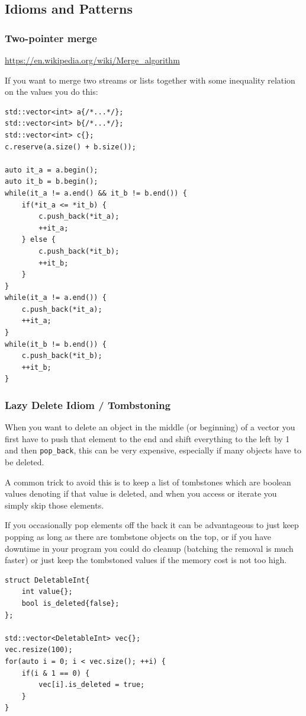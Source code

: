 \documentclass{article}
\begin{document}
\subsection{Idioms and Patterns}
\subsubsection{Two-pointer merge}
\url{https://en.wikipedia.org/wiki/Merge_algorithm}

If you want to merge two streams or lists together with some inequality relation on the values you do this:
\begin{lstlisting}
std::vector<int> a{/*...*/};
std::vector<int> b{/*...*/};
std::vector<int> c{};
c.reserve(a.size() + b.size());

auto it_a = a.begin();
auto it_b = b.begin();
while(it_a != a.end() && it_b != b.end()) {
    if(*it_a <= *it_b) {
        c.push_back(*it_a);
        ++it_a;
    } else {
        c.push_back(*it_b);
        ++it_b;
    }
}
while(it_a != a.end()) {
    c.push_back(*it_a);
    ++it_a;
}
while(it_b != b.end()) {
    c.push_back(*it_b);
    ++it_b;
}
\end{lstlisting}

\subsubsection{Lazy Delete Idiom / Tombstoning}
When you want to delete an object in the middle (or beginning) of a vector you first have to push that element to the end and shift everything to the left by 1 and then \texttt{pop\_back}, this can be very expensive, especially if many objects have to be deleted.

A common trick to avoid this is to keep a list of tombstones which are boolean values denoting if that value is deleted, and when you access or iterate you simply skip those elements.

If you occasionally pop elements off the back it can be advantageous to just keep popping as long as there are tombstone objects on the top, or if you have downtime in your program you could do cleanup (batching the removal is much faster) or just keep the tombstoned values if the memory cost is not too high.
\begin{lstlisting}
struct DeletableInt{
    int value{};
    bool is_deleted{false};
};

std::vector<DeletableInt> vec{};
vec.resize(100);
for(auto i = 0; i < vec.size(); ++i) {
    if(i & 1 == 0) {
        vec[i].is_deleted = true;
    }
}
\end{lstlisting}
\end{document}
